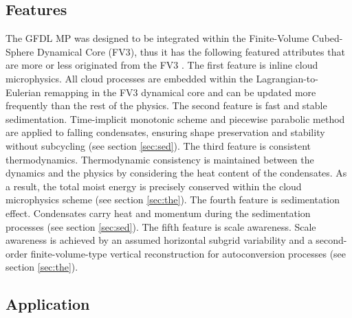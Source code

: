 \documentclass[letterpaper,titlepage,10pt]{article}
\numberwithin{equation}{section}
\begin{document}

\subsection{Features}

The GFDL MP was designed to be integrated within the Finite-Volume Cubed-Sphere Dynamical Core (FV3), thus it has the following featured attributes that are more or less originated from the FV3 \citep{zhou2019towa, harris2020gfdl}. The first feature is inline cloud microphysics. All cloud processes are embedded within the Lagrangian-to-Eulerian remapping in the FV3 dynamical core and can be updated more frequently than the rest of the physics. The second feature is fast and stable sedimentation. Time-implicit monotonic scheme and piecewise parabolic method are applied to falling condensates, ensuring shape preservation and stability without subcycling (see section \ref{sec:sed}). The third feature is consistent thermodynamics. Thermodynamic consistency is maintained between the dynamics and the physics by considering the heat content of the condensates. As a result, the total moist energy is precisely conserved within the cloud microphysics scheme (see section \ref{sec:the}). The fourth feature is sedimentation effect. Condensates carry heat and momentum during the sedimentation processes (see section \ref{sec:sed}). The fifth feature is scale awareness. Scale awareness is achieved by an assumed horizontal subgrid variability and a second-order finite-volume-type vertical reconstruction for autoconversion processes (see section \ref{sec:the}).


\subsection{Application}
\end{document}
